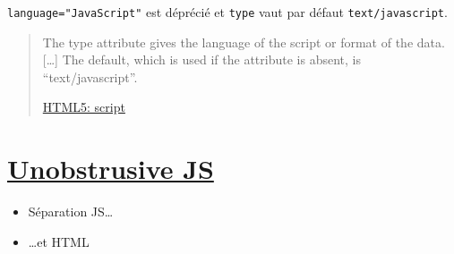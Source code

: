 \textenglish{\texttt{language="JavaScript"}} est déprécié et
\textenglish{\texttt{type}} vaut par défaut
\textenglish{\texttt{text/javascript}}.

\begin{quote}
The type attribute gives the language of the script or format of the
data. {[}\ldots{]} The default, which is used if the attribute is
absent, is ``text/javascript''.

\href{https://www.w3.org/TR/html5/scripting-1.html\#the-script-element}{HTML5:
script}
\end{quote}

\hypertarget{unobstrusive-js}{%
\section{\texorpdfstring{\href{https://en.wikipedia.org/wiki/Unobtrusive_JavaScript}{Unobstrusive
JS}}{Unobstrusive JS}}\label{unobstrusive-js}}

\begin{itemize}
\tightlist
\item
  Séparation JS\ldots{}
\end{itemize}

\begin{english}

\begin{Shaded}
\begin{Highlighting}[]
\NormalTok{(}\OperatorTok{,} \NormalTok{() \{}
    \NormalTok{(}\NormalTok{)}\NormalTok{(}\OperatorTok{,}\OperatorTok{;}
\NormalTok{\}}\OperatorTok{;}
\end{Highlighting}
\end{Shaded}

\end{english}

\begin{itemize}
\tightlist
\item
  \ldots et HTML
\end{itemize}

\begin{english}

\begin{Shaded}
\begin{Highlighting}[]
     \KeywordTok{/\textgreater{}}
\end{Highlighting}
\end{Shaded}

\end{english}


